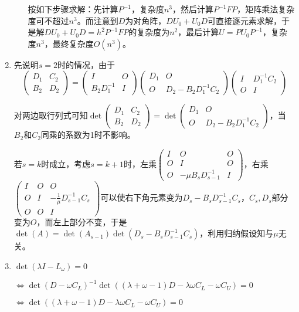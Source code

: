 \documentclass[a4paper,UTF8,fontset=windows]{ctexart}
\begin{document}
\begin{enumerate}
\begin{enumerate}
按如下步骤求解：先计算$P^{-1}$，复杂度$n^3$，然后计算$P^{-1}FP$，矩阵乘法复杂度可不超过$n^3$。而注意到$D$为对角阵，$DU_0+U_0D$可直接逐元素求解，于是解$DU_0+U_0D=h^2P^{-1}FP$的复杂度为$n^2$，最后计算$U=PU_0P^{-1}$，复杂度$n^3$，最终复杂度$O(n^3)$。
\end{enumerate}

\item
先说明$s=2$时的情况，由于
$$\begin{pmatrix}D_1&C_2\\B_2&D_2\end{pmatrix}=\begin{pmatrix}I&O\\B_2D_1^{-1}&I\end{pmatrix}\begin{pmatrix}D_1&O\\O&D_2-B_2D_1^{-1}C_2\end{pmatrix}\begin{pmatrix}I&D_1^{-1}C_2\\O&I\end{pmatrix}$$

对两边取行列式可知$\det\begin{pmatrix}D_1&C_2\\B_2&D_2\end{pmatrix}=\det\begin{pmatrix}D_1&O\\O&D_2-B_2D_1^{-1}C_2\end{pmatrix}$，当$B_2$和$C_2$同乘的系数为1时不影响。

若$s=k$时成立，考虑$s=k+1$时，左乘$\begin{pmatrix}I&O&O\\O&I&O\\O&-\mu B_sD_{s-1}^{-1}&I\end{pmatrix}$，右乘$\begin{pmatrix}I&O&O\\O&I&-\frac{1}{\mu}D_{s-1}^{-1}C_s\\O&O&I\end{pmatrix}$可以使右下角元素变为$D_s-B_sD_{s-1}^{-1}C_s$，$C_s,D_s$部分变为$O$，而左上部分不变，于是$\det(A)=\det(A_{s-1})\det(D_s-B_sD_{s-1}^{-1}C_s)$，利用归纳假设知与$\mu$无关。

\item
$\det(\lambda I-L_\omega)=0$

$\Leftrightarrow\det(D-\omega C_L)^{-1}\det((\lambda+\omega-1)D-\lambda\omega C_L-\omega C_U)=0$

$\Leftrightarrow\det((\lambda+\omega-1)D-\lambda\omega C_L-\omega C_U)=0$


\end{enumerate}
\end{document}
